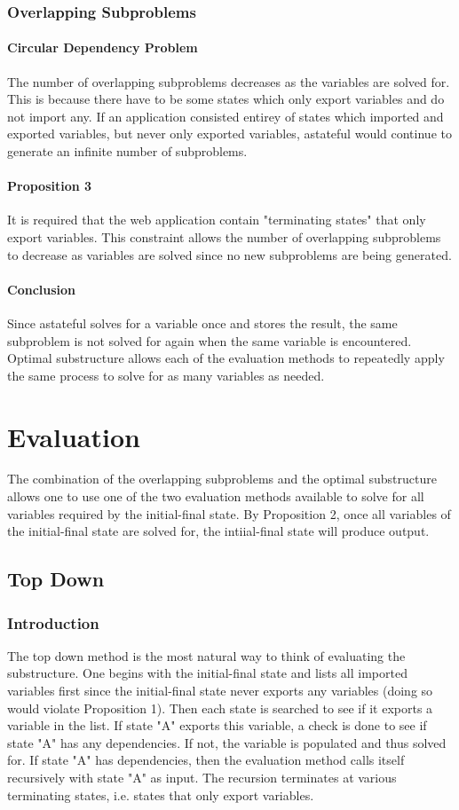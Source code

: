 \documentclass[11pt,twocolumn]{article}
\begin{document}
\subsubsection{Overlapping Subproblems}
\paragraph{Circular Dependency Problem}
The number of overlapping subproblems decreases as the variables are solved for. This is because there have to be some states which only export variables and do not import any. If an application consisted entirey of states which imported and exported variables, but never only exported variables, astateful would continue to generate an infinite number of subproblems.
\paragraph{Proposition 3}
It is required that the web application contain "terminating states" that only export variables. This constraint allows the number of overlapping subproblems to decrease as variables are solved since no new subproblems are being generated.
\paragraph{Conclusion}
Since astateful solves for a variable once and stores the result, the same subproblem is not solved for again when the same variable is encountered. Optimal substructure allows each of the evaluation methods to repeatedly apply the same process to solve for as many variables as needed.

\section{Evaluation}
The combination of the overlapping subproblems and the optimal substructure allows one to use one of the two evaluation methods available to solve for all variables required by the initial-final state. By Proposition 2, once all variables of the initial-final state are solved for, the intiial-final state will produce output.
\subsection{Top Down}
\subsubsection{Introduction}
The top down method is the most natural way to think of evaluating the substructure. One begins with the initial-final state and lists all imported variables first since the initial-final state never exports any variables (doing so would violate Proposition 1). Then each state is searched to see if it exports a variable in the list. If state "A" exports this variable, a check is done to see if state "A" has any dependencies. If not, the variable is populated and thus solved for. If state "A" has dependencies, then the evaluation method calls itself recursively with state "A" as input. The recursion terminates at various terminating states, i.e. states that only export variables.
\end{document}
